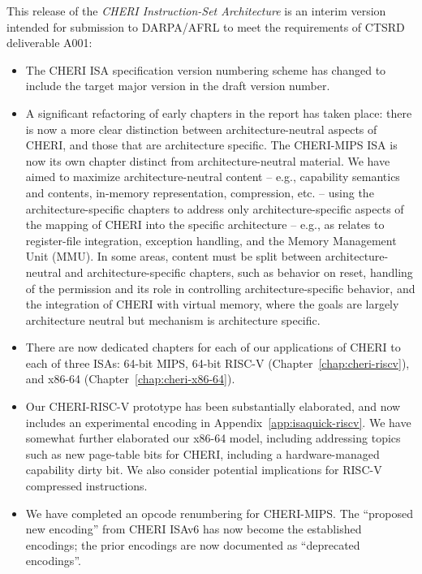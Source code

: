 This release of the \textit{CHERI Instruction-Set Architecture} is an
interim version intended for submission to DARPA/AFRL to meet the requirements
of CTSRD deliverable A001:

\begin{itemize}
\item The CHERI ISA specification version numbering scheme has changed to
include the target major version in the draft version number.

\item A significant refactoring of early chapters in the report has taken place:
there is now a more clear distinction between architecture-neutral aspects
of CHERI, and those that are architecture specific.
The CHERI-MIPS ISA is now its own chapter distinct from architecture-neutral
material.
We have aimed to maximize architecture-neutral content -- e.g., capability
semantics and contents, in-memory representation, compression, etc. -- using
the architecture-specific chapters to address only architecture-specific
aspects of the mapping of CHERI into the specific architecture -- e.g., as
relates to register-file integration, exception handling, and the Memory
Management Unit (MMU).
In some areas, content must be split between architecture-neutral and
architecture-specific chapters, such as behavior on reset, handling of the
\cappermASR permission and its role in controlling
architecture-specific behavior, and the integration of CHERI with virtual
memory, where the goals are largely architecture neutral but mechanism is
architecture specific.

\item There are now dedicated chapters for each of our applications of CHERI
to each of three ISAs: 64-bit MIPS, 64-bit
RISC-V (Chapter~\ref{chap:cheri-riscv}), and x86-64
(Chapter~\ref{chap:cheri-x86-64}).

\item Our CHERI-RISC-V prototype has been substantially elaborated, and now
includes an experimental encoding in Appendix~\ref{app:isaquick-riscv}.
We have somewhat further elaborated our x86-64 model, including addressing
topics such as new page-table bits for CHERI, including a hardware-managed
capability dirty bit.
We also consider potential implications for RISC-V compressed instructions.

\item We have completed an opcode renumbering for CHERI-MIPS.
The ``proposed new encoding'' from CHERI ISAv6 has now become the
established encodings; the prior encodings are now documented as
``deprecated encodings''.


\end{itemize}
